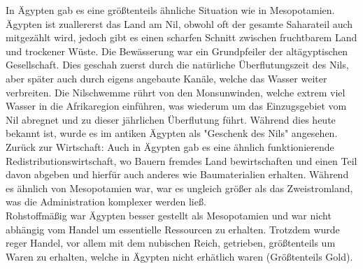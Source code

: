 \documentclass{article}
\begin{document}
	In Ägypten gab es eine größtenteils ähnliche Situation wie in Mesopotamien. Ägypten ist zuallererst das Land am Nil, obwohl oft der gesamte Saharateil auch mitgezählt wird, jedoch gibt es einen scharfen Schnitt zwischen fruchtbarem Land und trockener Wüste. Die Bewässerung war ein Grundpfeiler der altägyptischen Gesellschaft. Dies geschah zuerst durch die natürliche Überflutungszeit des Nils, aber später auch durch eigens angebaute Kanäle, welche das Wasser weiter verbreiten. Die Nilschwemme rührt von den Monsunwinden, welche extrem viel Wasser in die Afrikaregion einführen, was wiederum um das Einzugsgebiet vom Nil abregnet und zu dieser jährlichen Überflutung führt. Während dies heute bekannt ist, wurde es im antiken Ägypten als "Geschenk des Nils" angesehen. \\
	Zurück zur Wirtschaft: Auch in Ägypten gab es eine ähnlich funktionierende Redistributionswirtschaft, wo Bauern fremdes Land bewirtschaften und einen Teil davon abgeben und hierfür auch anderes wie Baumaterialien erhalten. Während es ähnlich von Mesopotamien war, war es ungleich größer als das Zweistromland, was die Administration komplexer werden ließ. \\
	Rohstoffmäßig war Ägypten besser gestellt als Mesopotamien und war nicht abhängig vom Handel um essentielle Ressourcen zu erhalten. Trotzdem wurde reger Handel, vor allem mit dem nubischen Reich, getrieben, größtenteils um Waren zu erhalten, welche in Ägypten nicht erhätlich waren (Größtenteils Gold). \\
	
\end{document}
